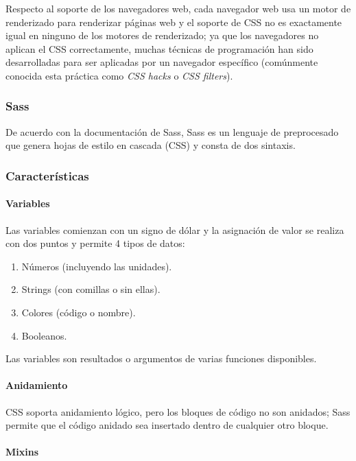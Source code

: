 Respecto al soporte de los navegadores web, cada navegador web usa un motor de renderizado para renderizar páginas web y el soporte de CSS no es exactamente igual en ninguno de los motores de renderizado; ya que los navegadores no aplican el CSS correctamente, muchas técnicas de programación han sido desarrolladas para ser aplicadas por un navegador específico (comúnmente conocida esta práctica como \textit{CSS hacks} o \textit{CSS filters}).


\subsubsection*{Sass}

De acuerdo con la documentación de Sass\cite{noauthor_documentation_nodate}, Sass es un lenguaje de preprocesado que genera hojas de estilo en cascada (CSS) y consta de dos sintaxis.

\subsubsection*{Características}

\paragraph*{Variables}
Las variables comienzan con un signo de dólar y la asignación de valor se realiza con dos puntos y permite 4 tipos de datos:

\begin{enumerate}
    \item Números (incluyendo las unidades).
    \item Strings (con comillas o sin ellas).
    \item Colores (código o nombre).
    \item Booleanos.
\end{enumerate}
Las variables son resultados o argumentos de varias funciones disponibles.

\paragraph*{Anidamiento}
CSS soporta anidamiento lógico, pero los bloques de código no son anidados; Sass permite que el código anidado sea insertado dentro de cualquier otro bloque.


\paragraph*{Mixins}

